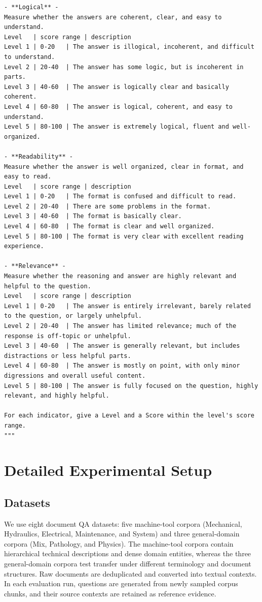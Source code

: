 \documentclass{article} %
\begin{document}
\begin{lstlisting}
- **Logical** -
Measure whether the answers are coherent, clear, and easy to understand.
Level   | score range | description
Level 1 | 0-20   | The answer is illogical, incoherent, and difficult to understand.
Level 2 | 20-40  | The answer has some logic, but is incoherent in parts.
Level 3 | 40-60  | The answer is logically clear and basically coherent.
Level 4 | 60-80  | The answer is logical, coherent, and easy to understand.
Level 5 | 80-100 | The answer is extremely logical, fluent and well-organized.

- **Readability** -
Measure whether the answer is well organized, clear in format, and easy to read.
Level   | score range | description
Level 1 | 0-20   | The format is confused and difficult to read.
Level 2 | 20-40  | There are some problems in the format.
Level 3 | 40-60  | The format is basically clear.
Level 4 | 60-80  | The format is clear and well organized.
Level 5 | 80-100 | The format is very clear with excellent reading experience.

- **Relevance** -
Measure whether the reasoning and answer are highly relevant and helpful to the question.
Level   | score range | description
Level 1 | 0-20   | The answer is entirely irrelevant, barely related to the question, or largely unhelpful.
Level 2 | 20-40  | The answer has limited relevance; much of the response is off-topic or unhelpful.
Level 3 | 40-60  | The answer is generally relevant, but includes distractions or less helpful parts.
Level 4 | 60-80  | The answer is mostly on point, with only minor digressions and overall useful content.
Level 5 | 80-100 | The answer is fully focused on the question, highly relevant, and highly helpful.

For each indicator, give a Level and a Score within the level's score range.
"""
\end{lstlisting}

\section{Detailed Experimental Setup}
\label{app:experimental_setup}

\subsection{Datasets}

We use eight document QA datasets: five machine-tool corpora (Mechanical, Hydraulics, Electrical, Maintenance, and System) and three general-domain corpora (Mix, Pathology, and Physics). The machine-tool corpora contain hierarchical technical descriptions and dense domain entities, whereas the three general-domain corpora test transfer under different terminology and document structures. Raw documents are deduplicated and converted into textual contexts. In each evaluation run, questions are generated from newly sampled corpus chunks, and their source contexts are retained as reference evidence.
\end{document}
